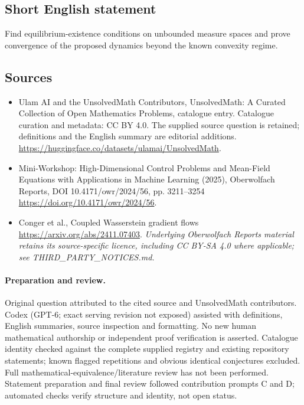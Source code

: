 \documentclass[11pt]{article}
\begin{document}
\subsection{Short English statement}
Find equilibrium-existence conditions on unbounded measure spaces and prove convergence of the proposed dynamics beyond the known convexity regime.
\subsection{Sources}
\begin{itemize}
\item[\hypertarget{source:statement:1}{S1}] Ulam AI and the UnsolvedMath Contributors, UnsolvedMath: A Curated Collection of Open Mathematics Problems, catalogue entry. Catalogue curation and metadata: CC BY 4.0. The supplied source question is retained; definitions and the English summary are editorial additions.
\url{https://huggingface.co/datasets/ulamai/UnsolvedMath}.
\item[\hypertarget{source:statement:2}{S2}] Mini-Workshop: High-Dimensional Control Problems and Mean-Field Equations with Applications in Machine Learning (2025), Oberwolfach Reports, DOI 10.4171/owr/2024/56, pp. 3211--3254
\url{https://doi.org/10.4171/owr/2024/56}.
\item[\hypertarget{source:statement:3}{S3}] Conger et al., Coupled Wasserstein gradient flows
\url{https://arxiv.org/abs/2411.07403}.
\textit{Underlying Oberwolfach Reports material retains its source-specific licence, including CC BY-SA 4.0 where applicable; see THIRD\_PARTY\_NOTICES.md.}
\end{itemize}
\paragraph{Preparation and review.}
Original question attributed to the cited source and UnsolvedMath contributors. Codex (GPT-6; exact serving revision not exposed) assisted with definitions, English summaries, source inspection and formatting. No new human mathematical authorship or independent proof verification is asserted. Catalogue identity checked against the complete supplied registry and existing repository statements; known flagged repetitions and obvious identical conjectures excluded. Full mathematical-equivalence/literature review has not been performed. Statement preparation and final review followed contribution prompts C and D; automated checks verify structure and identity, not open status.
\label{end:statement}
\end{document}
